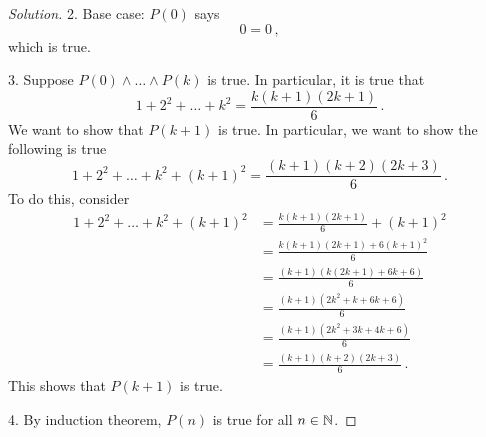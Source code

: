 \documentclass[12pt]{amsart}
\begin{document}
\begin{enumerate}[label=\arabic*.,itemsep=10pt, leftmargin=*]
\begin{proof}[Solution]
    2. Base case: $P(0)$ says 
        \begin{equation*}
            0 = 0 \,,
        \end{equation*}
        which is true.

    3. Suppose $P(0) \wedge \dots \wedge P(k)$ is true.
    In particular, it is true that 
    \begin{equation*}
       1 + 2^2 + \dots + k^2 = \frac{k(k+1)(2k+1)}{6}\,.
    \end{equation*}
    We want to show that $P(k+1)$ is true. In particular, we want to show the following is true
    \begin{equation*}
       1 + 2^2 + \dots + k^2 + (k+1)^2 = \frac{(k+1)(k+2)(2k+3)}{6}\,.
    \end{equation*}
    To do this, consider
    \begin{align*}
       1 + 2^2 + \dots + k^2 + (k+1)^2 & = 
            \frac{k(k+1)(2k+1)}{6} + (k+1)^2 \\
           & =  \frac{k(k+1)(2k+1) + 6 (k+1)^2}{6}  \\
           & =  \frac{(k+1)(k(2k+1) + 6k + 6) }{6}  \\
           & =  \frac{(k+1)(2k^2+ k+ 6k + 6) }{6}  \\
           & =  \frac{(k+1)(2k^2+ 3k+ 4k + 6) }{6}  \\
           &= \frac{(k+1)(k+2)(2k+3)}{6}\,.
    \end{align*}
This shows that $P(k+1)$ is true.

4. By induction theorem, $P(n)$ is true for all $n\in \mathbb{N}$.
    \end{proof}

\end{enumerate}
\end{document}
